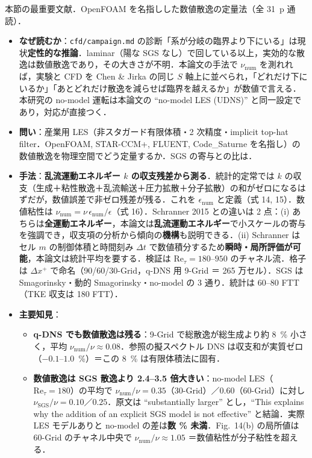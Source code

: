 \documentclass[11pt]{jsarticle}
\newcommand{\litref}[1]{{\large\bfseries\color{citecolor}#1}}
\begin{document}
\noindent\litref{Komen et al. (2017)}\quad 本節の最重要文献．OpenFOAM を名指しした数値散逸の定量法（全 31~p 通読）．
\begin{itemize}
  \item \textbf{なぜ読むか}：\texttt{cfd/campaign.md} の診断「系が分岐の臨界より下にいる」は現状\textbf{定性的な推論}．laminar（陽な SGS なし）で回している以上，実効的な散逸は数値散逸であり，その大きさが不明．本論文の手法で $\nu_\mathrm{num}$ を測れれば，実験と CFD を Chen \& Jirka の同じ $S$ 軸上に並べられ，「どれだけ下にいるか」「あとどれだけ散逸を減らせば臨界を越えるか」が数値で言える．本研究の no-model 運転は本論文の ``no-model LES (UDNS)'' と同一設定であり，対応が直接つく．
  \item \textbf{問い}：産業用 LES（非スタガード有限体積・2 次精度・implicit top-hat filter．OpenFOAM, STAR-CCM+, FLUENT, Code\_Saturne を名指し）の数値散逸を物理空間でどう定量するか．SGS の寄与との比は．
  \item \textbf{手法}：\textbf{乱流運動エネルギー $k$ の収支残差から測る}．統計的定常では $k$ の収支（生成＋粘性散逸＋乱流輸送＋圧力拡散＋分子拡散）の和がゼロになるはずだが，数値誤差で非ゼロ残差が残る．これを $\epsilon_\mathrm{num}$ と定義（式 14, 15）．数値粘性は $\nu_\mathrm{num} = \nu\,\epsilon_\mathrm{num}/\epsilon$（式 16）．Schranner 2015 との違いは 2 点：(i) あちらは\textbf{全運動エネルギー}，本論文は\textbf{乱流運動エネルギー}で小スケールの寄与を強調でき，収支項の分析から傾向の\textbf{機構}も説明できる．(ii) Schranner はセル $m$ の制御体積と時間刻み $\Delta t$ で数値積分するため\textbf{瞬時・局所評価が可能}，本論文は統計平均を要する．検証は $\mathrm{Re}_\tau = 180$--$950$ のチャネル流．格子は $\Delta x^+$ で命名（90/60/30-Grid，q-DNS 用 9-Grid ＝ 265 万セル）．SGS は Smagorinsky・動的 Smagorinsky・no-model の 3 通り．統計は 60--80 FTT（TKE 収支は 180 FTT）．
  \item \textbf{主要知見}：
  \begin{itemize}
    \item \textbf{q-DNS でも数値散逸は残る}：9-Grid で総散逸が総生成より約 8~\% 小さく，平均 $\nu_\mathrm{num}/\nu \approx 0.08$．参照の擬スペクトル DNS は収支和が実質ゼロ（$-0.1$--$1.0$~\%）＝この 8~\% は有限体積法に固有．
    \item \textbf{数値散逸は SGS 散逸より 2.4--3.5 倍大きい}：no-model LES（$\mathrm{Re}_\tau = 180$）の平均で $\nu_\mathrm{num}/\nu = 0.35$（30-Grid）／$0.60$（60-Grid）に対し $\nu_\mathrm{SGS}/\nu = 0.10$／$0.25$．原文は ``substantially larger'' とし，``This explains why the addition of an explicit SGS model is not effective'' と結論．実際 LES モデルありと no-model の差は\textbf{数 \% 未満}．Fig.~14(b) の局所値は 60-Grid のチャネル中央で $\nu_\mathrm{num}/\nu \approx 1.05$ ＝数値粘性が分子粘性を超える．

\end{itemize}
\end{itemize}
\end{document}
